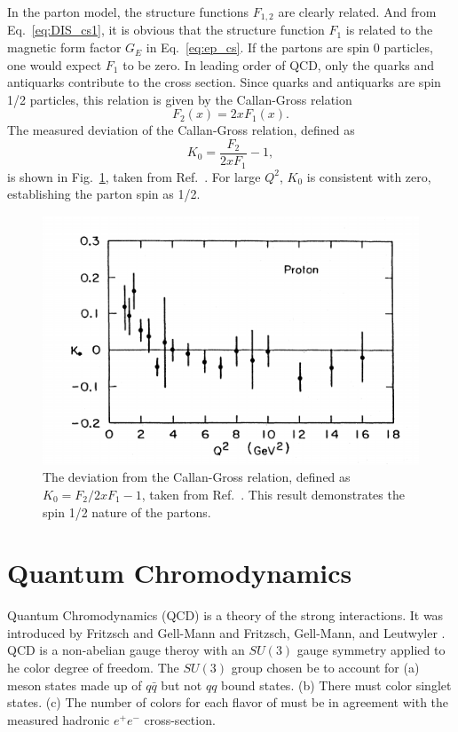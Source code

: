 In the parton model, the structure functions $F_{1,2}$ are clearly related. And
from Eq.\ \ref{eq:DIS_cs1}, it is obvious that the structure function $F_1$ is 
related to the magnetic form factor $G_E$ in Eq.\ \ref{eq:ep_cs}. If the partons
are spin 0 particles, one would expect $F_1$ to be zero. In leading order of QCD,
only the quarks and antiquarks contribute to the cross section. Since quarks and 
antiquarks are spin 1/2 particles, this relation is given by the Callan-Gross 
relation\cite{callan1968,callan1969}
\begin{equation}
F_2\left(x\right) = 2x F_1\left(x\right).
\end{equation}
The measured deviation of the Callan-Gross relation, defined as 
\begin{equation}
K_0 = \frac{F_2}{2xF_1}-1,
\end{equation}
is shown in Fig.\ \ref{fig:callan_gross}, taken from Ref.\ \cite{kendall1991}. 
For large $Q^2$, $K_0$ is consistent with zero, establishing the parton spin as
1/2.
\begin{figure}[htbp!]
\centering
\includegraphics[width=0.5\linewidth]{images/Callan_Gross_relation}
\caption{The deviation from the Callan-Gross relation, defined as 
	$K_0=F_2/2xF_1 -1$, taken from Ref.\ \cite{kendall1991}. This result
	demonstrates the spin 1/2 nature of the partons.}
\label{fig:callan_gross}
\end{figure}

\section{Quantum Chromodynamics}
\label{sec:QCD}
Quantum Chromodynamics (QCD) is a theory of the strong interactions. It was 
introduced by Fritzsch and Gell-Mann \cite{fritzsch1972} and Fritzsch, Gell-Mann,
and Leutwyler \cite{fritzsch1973}. QCD is a non-abelian gauge theroy with an 
$SU(3)$ gauge symmetry applied to he color degree of freedom. The $SU(3)$ group 
chosen be to account for (a) meson states made up of $q\bar{q}$ but not $qq$ bound states.
(b) There must color singlet states. (c) The number of colors for each flavor of
must be in agreement with the measured hadronic $e^+ e^-$ cross-section.


